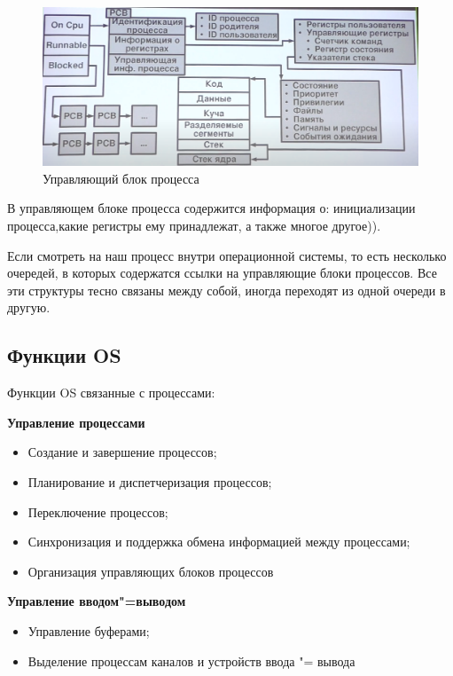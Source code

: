 \documentclass[bachelor, och, book]{SCWorks}
\theoremstyle{remark}
\begin{document}
    \begin{figure}[H]
        \begin{center}
            \includegraphics[scale=0.45]{res/Process-Control-Block.png}
            \caption{Управляющий блок процесса}
        \end{center}
    \end{figure}

    В управляющем блоке процесса содержится информация о: инициализации процесса,какие регистры ему принадлежат, а также многое другое)).

    Если смотреть на наш процесс внутри операционной системы, то есть несколько очередей, в которых содержатся ссылки на управляющие блоки процессов. Все эти структуры тесно связаны между собой, иногда переходят из одной очереди в другую.

    \subsection{Функции OS}

    Функции OS связанные с процессами:

    \hfill \break
    \textbf{Управление процессами}
    \begin{itemize}[label=$\bullet$]
        \item Создание и завершение процессов;
        \item Планирование и диспетчеризация процессов;
        \item Переключение процессов;
        \item Синхронизация и поддержка обмена информацией между процессами;
        \item Организация управляющих блоков процессов
    \end{itemize}

    \hfill \break
    \textbf{Управление вводом"=выводом}
    \begin{itemize}[label=$\bullet$]
        \item Управление буферами;
        \item Выделение процессам каналов и устройств ввода "= вывода
    \end{itemize}
\end{document}
